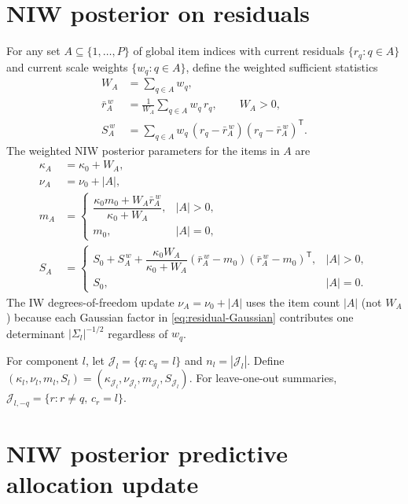 \documentclass[11pt]{article}
\newcommand{\trans}{^{\mathsf T}}
\begin{document}
\section{NIW posterior on residuals}
\label{sec:niw-residual}

For any set $A\subseteq\{1,\dots,P\}$ of global item indices with current
residuals $\{r_q:q\in A\}$ and current scale weights $\{w_q:q\in A\}$,
define the weighted sufficient statistics
\begin{align}
    W_A &= \sum_{q\in A}w_q,
    \\
    \bar r_A^{\,w} &=
    \frac{1}{W_A}\sum_{q\in A}w_q\,r_q,
    \qquad W_A>0,
    \\
    S_A^{\,w} &= \sum_{q\in A}w_q\,
    (r_q-\bar r_A^{\,w})(r_q-\bar r_A^{\,w})\trans.
\end{align}
The weighted NIW posterior parameters for the items in $A$ are
\begin{align}
    \kappa_A &= \kappa_0+W_A,
    \label{eq:kappa-post}\\
    \nu_A &= \nu_0+|A|,
    \label{eq:nu-post}\\
    m_A &=
    \begin{cases}
    \dfrac{\kappa_0 m_0+W_A\bar r_A^{\,w}}{\kappa_0+W_A},
    & |A|>0,\\[1em]
    m_0, & |A|=0,
    \end{cases}
    \label{eq:m-post}\\
    S_A &=
    \begin{cases}
    S_0+S_A^{\,w}+
    \dfrac{\kappa_0 W_A}{\kappa_0+W_A}
    (\bar r_A^{\,w}-m_0)(\bar r_A^{\,w}-m_0)\trans,
    & |A|>0,\\[1em]
    S_0, & |A|=0.
    \end{cases}
    \label{eq:S-post}
\end{align}
The IW degrees-of-freedom update $\nu_A=\nu_0+|A|$ uses the item count
$|A|$ (not $W_A$) because each Gaussian factor in
\eqref{eq:residual-Gaussian} contributes one determinant
$|\Sigma_l|^{-1/2}$ regardless of $w_q$.

For component $l$, let $\mathcal J_l=\{q:c_q=l\}$ and $n_l=|\mathcal J_l|$.
Define
$(\kappa_l,\nu_l,m_l,S_l)
=(\kappa_{\mathcal J_l},\nu_{\mathcal J_l},m_{\mathcal J_l},S_{\mathcal J_l})$.
For leave-one-out summaries, $\mathcal J_{l,-q}=\{r:r\neq q,\,c_r=l\}$.

\section{NIW posterior predictive allocation update}
\label{sec:c-update}
\end{document}
